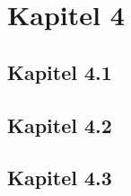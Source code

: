 \section{Kapitel 4} \label{sec:4} \thispagestyle{firstsection}
\subsection{Kapitel 4.1} \label{sec:4_1}



\subsection{Kapitel 4.2} \label{sec:4_2}



\subsection{Kapitel 4.3} \label{sec:4_3}

